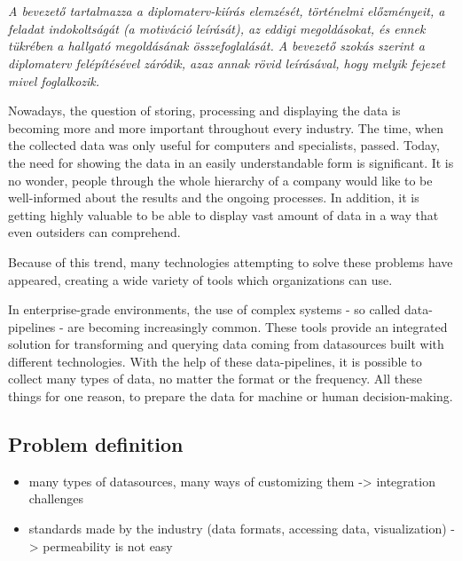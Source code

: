 \chapter{\bevezetes}

\textit{A bevezető tartalmazza a diplomaterv-kiírás elemzését, történelmi előzményeit, a feladat indokoltságát (a motiváció leírását), az eddigi megoldásokat, és ennek tükrében a hallgató megoldásának összefoglalását.
A bevezető szokás szerint a diplomaterv felépítésével záródik, azaz annak rövid leírásával, hogy melyik fejezet mivel foglalkozik.}


Nowadays, the question of storing, processing and displaying the data is becoming more and more important throughout every industry. The time, when the collected data was only useful for computers and specialists, passed. Today, the need for showing the data in an easily understandable form is significant. It is no wonder, people through the whole hierarchy of a company would like to be well-informed about the results and the ongoing processes. In addition, it is getting highly valuable to be able to display vast amount of data in a way that even outsiders can comprehend.

Because of this trend, many technologies attempting to solve these problems have
appeared, creating a wide variety of tools which organizations can use.

In enterprise-grade environments, the use of complex systems - so called data-pipelines - are becoming increasingly common. These tools provide an integrated solution for transforming and querying data coming from datasources built with different technologies. With the help of these data-pipelines, it is possible to collect many types of data, no matter the format or the frequency. All these things for one reason, to prepare the data for machine or human decision-making.

\section{Problem definition}

\begin{itemize}
	\item many types of datasources, many ways of customizing them -> integration challenges
	\item standards made by the industry (data formats, accessing data, visualization) -> permeability is not easy
\end{itemize}



